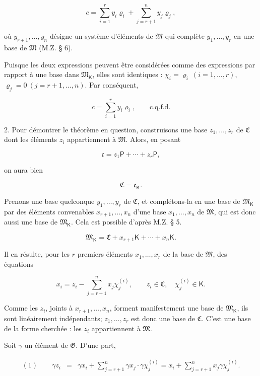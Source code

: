 \[
c=\sum_{i=1}^{r}y_i\varrho_i+
\sum_{j=r+1}^{n}y_j\varrho_j,
\]

où \(y_{r+1},\ldots,y_n\) désigne un système d'éléments de \(\mathfrak M\) qui complète \(y_1,\ldots,y_r\) en une base de \(\mathfrak M\) (M.Z. \S{} 6).

Puisque les deux expressions peuvent être considérées comme des expressions par rapport à une base dans \(\mathfrak M_{\mathsf K}\), elles sont identiques : \(\chi_i=\varrho_i\ (i=1,\ldots,r)\), \(\varrho_j=0\ (j=r+1,\ldots,n)\). Par conséquent,

\[
c=\sum_{i=1}^{r}y_i\varrho_i,
\qquad\text{c.q.f.d.}
\]

2. Pour démontrer le théorème en question, construisons une base \(z_1,\ldots,z_r\) de \(\mathfrak C\) dont les éléments \(z_i\) appartiennent à \(\mathfrak M\). Alors, en posant

\[
\mathfrak c=z_1\mathsf P+\cdots+z_r\mathsf P,
\]

on aura bien

\[
\mathfrak C=\mathfrak c_{\mathsf K}.
\]

Prenons une base quelconque \(y_1,\ldots,y_r\) de \(\mathfrak C\), et complétons-la en une base de \(\mathfrak M_{\mathsf K}\) par des éléments convenables \(x_{r+1},\ldots,x_n\) d'une base \(x_1,\ldots,x_n\) de \(\mathfrak M\), qui est donc aussi une base de \(\mathfrak M_{\mathsf K}\). Cela est possible d'après M.Z. \S{} 5.

\[
\mathfrak M_{\mathsf K}=\mathfrak C+x_{r+1}\mathsf K+\cdots+x_n\mathsf K.
\]

Il en résulte, pour les \(r\) premiers éléments \(x_1,\ldots,x_r\) de la base de \(\mathfrak M\), des équations

\[
x_i=z_i-\sum_{j=r+1}^{n}x_j\chi_j^{(i)},
\qquad
z_i\in\mathfrak C,
\quad
\chi_j^{(i)}\in\mathsf K.
\]

Comme les \(z_i\), joints à \(x_{r+1},\ldots,x_n\), forment manifestement une base de \(\mathfrak M_{\mathsf K}\), ils sont linéairement indépendants; \(z_1,\ldots,z_r\) est donc une base de \(\mathfrak C\). C'est une base de la forme cherchée : les \(z_i\) appartiennent à \(\mathfrak M\).

Soit \(\gamma\) un élément de \(\mathfrak G\). D'une part,

\[
\begin{array}{rcl}
(1)\qquad \gamma z_i
&=&\gamma x_i+\displaystyle\sum_{j=r+1}^{n}\gamma x_j\cdot \gamma\chi_j^{(i)}
=x_i+\displaystyle\sum_{j=r+1}^{n}x_j\gamma\chi_j^{(i)}.
\end{array}
\]

